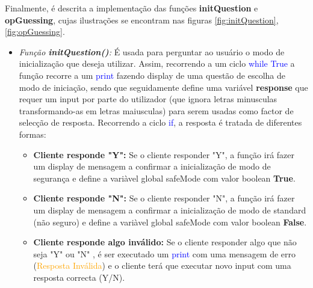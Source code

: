 Finalmente, é descrita a implementação das funções \textbf{initQuestion} e \textbf{opGuessing}, cujas ilustrações se encontram nas figuras \ref{fig:initQuestion}, \ref{fig:opGuessing}.
\begin{itemize}
	\item\textsl{Função \textbf{initQuestion()}:} É usada para perguntar ao usuário o modo de inicialização que deseja utilizar. Assim, recorrendo a um ciclo \textcolor{blue}{while True} a função recorre a um \textcolor{blue}{print} fazendo display de uma questão de escolha de modo de iniciação, sendo que seguidamente define uma variável \textbf{response} que requer um input por parte do utilizador (que ignora letras minusculas transformando-as em letras maiusculas) para serem usadas como factor de selecção de resposta. Recorrendo a ciclo \textcolor{blue}{if}, a resposta é tratada de diferentes formas:
	\begin{itemize}
		\item\textbf{{Cliente responde "Y":}} Se o cliente responder "Y", a função irá fazer um display de mensagem a confirmar a inicialização de modo de segurança e define a variàvel global safeMode com valor boolean \textbf{True}.
		\item\textbf{{Cliente responde "N":}} Se o cliente responder "N", a função irá fazer um display de mensagem a confirmar a inicialização de modo de standard (não seguro) e define a variàvel global safeMode com valor boolean \textbf{False}.
		\item\textbf{{Cliente responde algo inválido:}} Se o cliente responder algo que não seja "Y" ou "N" , é ser executado um \textcolor{blue}{print} com uma mensagem de erro (\textcolor{orange}{Resposta Inválida}) e o cliente terá que executar novo input com uma resposta correcta (Y/N).
	\end{itemize}			
		

\end{itemize}
